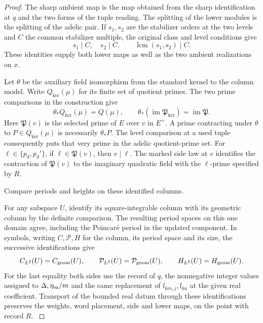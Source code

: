 \begin{proof}
The sharp ambient map is the map obtained from the sharp
identification at \(q\) and the two forms of the tuple
reading. The splitting of the lower modules is the splitting
of the adelic pair. If \(s_1,s_2\) are the stabilizer orders at the two levels and \(C\) the common stabilizer multiple, the original class and level conditions give
\[
 s_1\mid C,\quad s_2\mid C,\qquad \operatorname{lcm}(s_1,s_2)\mid C .
\] These identities supply
both lower maps as well as the two ambient realizations on
\(x\). \label{cor:completed-division-3}


Let \(\theta\) be the auxiliary field isomorphism from the
standard kernel to the column model. Write \(Q_{\ker}(\mu)\)
for its finite set of quotient primes. The two prime comparisons
in the construction give
\[
 \theta_*Q_{\ker}(\mu)=Q(\mu),\qquad
 \theta_*(\operatorname{im}\mathfrak P_{\ker})=
                         \operatorname{im}\mathfrak P .
\]
Here \(\mathfrak P(v)\) is the selected prime of \(E\) over
\(v\) in \(E^+\). A prime contracting under \(\theta\) to
\(P\in Q_{\ker}(\mu)\) is necessarily \(\theta_*P\). The
level comparison at a used tuple consequently puts that very
prime in the adelic quotient-prime set. For
\(\ell\in\{p_d,p_d'\}\), if \(\ell\in\mathfrak P(v)\), then
\(v\mid\ell\). The marked side law at \(v\) identifies the
contraction of \(\mathfrak P(v)\) to the imaginary quadratic
field with the \(\ell\)-prime specified by \(R\).
\label{cor:completed-division-4}

Compare periods and heights on these identified columns.


For any subspace \(U\), identify its square-integrable column
with its geometric column by the definite comparison. The
resulting period spaces on this one domain agree, including the
Poincar\'e period in the updated component. In symbols, writing
\(C,\mathcal P,H\) for the column, its period space and its size,
the successive identifications give
\[
 C_{L^2}(U)=C_{\rm geom}(U),\qquad
 \mathcal P_{L^2}(U)=\mathcal P_{\rm geom}(U),\qquad
 H_{L^2}(U)=H_{\rm geom}(U).
\]
For the last equality both sides use the record of \(q\), the
nonnegative integer values assigned to \(\Delta,\eta_{\rm sz}/m\) and the same
replacement of \(l_{6m,j},l_{6u}\) at the given real coefficient.
Transport of the bounded real datum through these identifications
preserves the weights, word placement, side and lower maps, on
the point with record \(R\). \label{cor:completed-division-5}
\end{proof}

